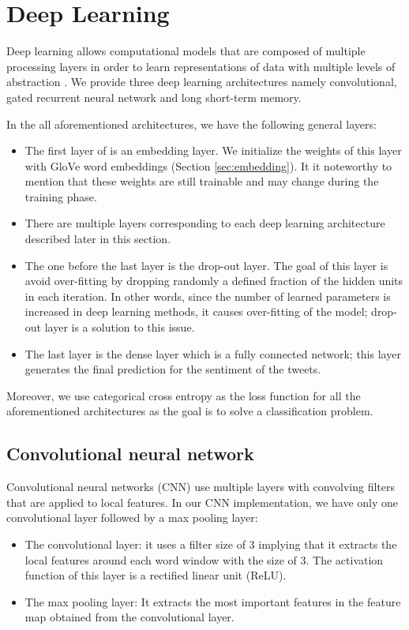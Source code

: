 \documentclass[8pt,conference,compsocconf]{IEEEtran}
\begin{document}
\section{Deep Learning} \label{sec:deeplearning}
Deep learning allows computational models that are composed of multiple processing layers in order to learn representations of data with multiple levels of abstraction \cite{deeplearning}. We provide three deep learning architectures namely convolutional, gated recurrent neural network and long short-term memory. 

In the all aforementioned architectures, we have the following general layers:
\begin{itemize}
	\item The first layer of is an embedding layer. We initialize the weights of this layer with GloVe word embeddings (Section \ref{sec:embedding}). It it noteworthy to mention that these weights are still trainable and may change during the training phase.
	\item There are multiple layers corresponding to each deep learning architecture described later in this section.
	\item The one before the last layer is the drop-out layer. The goal of this layer is avoid over-fitting by dropping randomly a defined fraction of the hidden units in each iteration. In other words, since the number of learned parameters is increased in deep learning methods, it causes over-fitting of the model; drop-out layer is a solution to this issue. 
	\item The last layer is the dense layer which is a fully connected network; this layer generates the final prediction for the sentiment of the tweets. 
\end{itemize}
Moreover, we use categorical cross entropy as the loss function for all the aforementioned architectures as the goal is to solve a classification problem.

\subsection{Convolutional neural network}
Convolutional neural networks (CNN) use multiple layers with convolving filters that are applied to local features. In our CNN implementation, we have only one convolutional layer followed by a max pooling layer:
\begin{itemize}
	\item The convolutional layer: it uses a filter size of $3$ implying that it extracts the local features around each word window with the size of $3$. The activation function of this layer is a rectified linear unit (ReLU). 
	\item The max pooling layer: It extracts the most important features in the feature map obtained from the convolutional layer.
\end{itemize}
\end{document}
